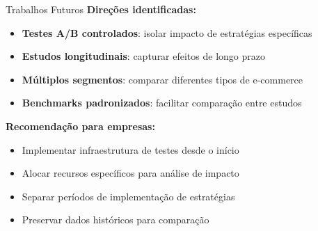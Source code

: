 \documentclass{beamer}
\begin{document}
    \begin{frame}{Trabalhos Futuros}
        \textbf{Direções identificadas:}

        \vspace{0.3cm}

        \begin{itemize}
            \item \textbf{Testes A/B controlados}: isolar impacto de estratégias específicas
            \item \textbf{Estudos longitudinais}: capturar efeitos de longo prazo
            \item \textbf{Múltiplos segmentos}: comparar diferentes tipos de e-commerce
            \item \textbf{Benchmarks padronizados}: facilitar comparação entre estudos
        \end{itemize}

        \vspace{0.4cm}

        \textbf{Recomendação para empresas:}
        \begin{itemize}
            \item Implementar infraestrutura de testes desde o início
            \item Alocar recursos específicos para análise de impacto
            \item Separar períodos de implementação de estratégias
            \item Preservar dados históricos para comparação
        \end{itemize}
    \end{frame}
\end{document}
